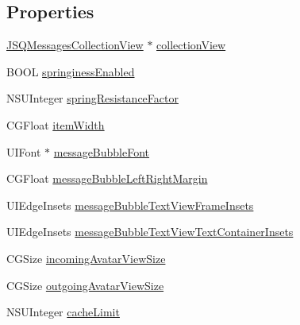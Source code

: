 \subsection*{Properties}
\begin{DoxyCompactItemize}
\item 
\hyperlink{interface_j_s_q_messages_collection_view}{J\+S\+Q\+Messages\+Collection\+View} $\ast$ \hyperlink{interface_j_s_q_messages_collection_view_flow_layout_a6f7171d412e190bbef0bd4b93d99da9d}{collection\+View}
\item 
B\+O\+O\+L \hyperlink{interface_j_s_q_messages_collection_view_flow_layout_aff25c7d92997659fd770b22b2ad6ce69}{springiness\+Enabled}
\item 
N\+S\+U\+Integer \hyperlink{interface_j_s_q_messages_collection_view_flow_layout_a44700cf3b96675ce91c62d5e957a4ecc}{spring\+Resistance\+Factor}
\item 
C\+G\+Float \hyperlink{interface_j_s_q_messages_collection_view_flow_layout_ae9ad830cfdb3a3fe8375cbd22af5c7e8}{item\+Width}
\item 
U\+I\+Font $\ast$ \hyperlink{interface_j_s_q_messages_collection_view_flow_layout_a9a98700ffd5c4acd0538b01b3da945c3}{message\+Bubble\+Font}
\item 
C\+G\+Float \hyperlink{interface_j_s_q_messages_collection_view_flow_layout_a2d57bd15268e1063676557bcc73c71b3}{message\+Bubble\+Left\+Right\+Margin}
\item 
U\+I\+Edge\+Insets \hyperlink{interface_j_s_q_messages_collection_view_flow_layout_a7dff7bb4f08899a86faa8a7914ff7f53}{message\+Bubble\+Text\+View\+Frame\+Insets}
\item 
U\+I\+Edge\+Insets \hyperlink{interface_j_s_q_messages_collection_view_flow_layout_a2a696c1e239c9d8ec6f85fb4e298a33b}{message\+Bubble\+Text\+View\+Text\+Container\+Insets}
\item 
C\+G\+Size \hyperlink{interface_j_s_q_messages_collection_view_flow_layout_a5a94d2ca4118b4dd633f08d2251e2447}{incoming\+Avatar\+View\+Size}
\item 
C\+G\+Size \hyperlink{interface_j_s_q_messages_collection_view_flow_layout_a01d91d9850fb667deefa69bbbbb58a03}{outgoing\+Avatar\+View\+Size}
\item 
N\+S\+U\+Integer \hyperlink{interface_j_s_q_messages_collection_view_flow_layout_a997ac903872be7898fd5696e76aa4be9}{cache\+Limit}
\end{DoxyCompactItemize}



